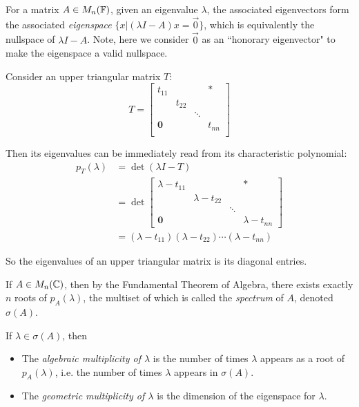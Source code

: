 \begin{definition}[Eigenspace]
\label{def:eigenspace}
For a matrix $A \in M_n(\mathbb F)$, given an eigenvalue $\lambda$, the associated eigenvectors form the associated \textit{eigenspace} $\{x | (\lambda I - A)x = \vec{0}\}$, which is equivalently the nullspace of $\lambda I - A$. Note, here we consider $\vec{0}$ as an ``honorary eigenvector" to make the eigenspace a valid nullspace.
\end{definition}

\begin{example}
Consider an upper triangular matrix $T$:
$$
T = \begin{bmatrix}
t_{11} &        &       & * \\
       & t_{22} &       &   \\
       &        & \ddots&   \\
\mathbf{0}     &        &       & t_{nn} \\
\end{bmatrix}
$$

Then its eigenvalues can be immediately read from its characteristic polynomial:
\begin{align*}
p_T(\lambda) &= \det(\lambda I - T)\\
             &= \det\begin{bmatrix} 
\lambda - t_{11} &        &       & * \\
       & \lambda - t_{22} &       &   \\
       &        & \ddots&   \\
\mathbf{0}  &        &       & \lambda - t_{nn}
\end{bmatrix} \\
             &= (\lambda - t_{11})(\lambda - t_{22})\cdots(\lambda - t_{nn})
\end{align*}

So the eigenvalues of an upper triangular matrix is its diagonal entries.
\end{example}

\begin{definition}[Spectrum]
\label{def:spectrum}
If $A \in M_n(\mathbb C)$, then by the Fundamental Theorem of Algebra, there exists exactly $n$ roots of $p_A(\lambda)$, the multiset of which is called the \textit{spectrum} of $A$, denoted $\sigma(A)$.
\end{definition}
\begin{definition}
\label{def:alg-mult-geom-mult}
If $\lambda \in \sigma(A)$, then
\begin{itemize}
    \item The \textit{algebraic multiplicity of $\lambda$} is the number of times $\lambda$ appears as a root of $p_A(\lambda)$, i.e. the number of times $\lambda$ appears in $\sigma(A)$.
    \item The \textit{geometric multiplicity of $\lambda$} is the dimension of the eigenspace for $\lambda$.
\end{itemize}
\end{definition}

